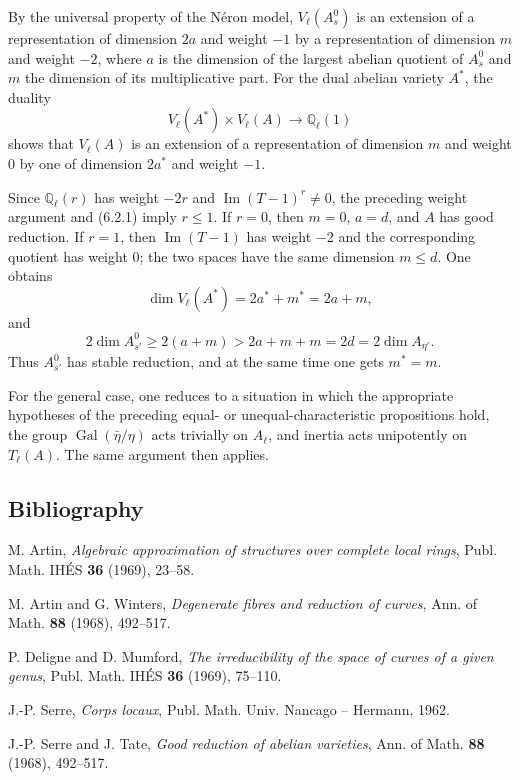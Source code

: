 \documentclass[11pt]{article}
\theoremstyle{plain}
\theoremstyle{definition}
\theoremstyle{remark}
\newcommand{\QQ}{\mathbb Q}
\DeclareMathOperator{\Gal}{Gal}
\begin{document}
By the universal property of the Néron model, $V_\ell(A_s^0)$ is an extension of a representation of dimension $2a$ and weight $-1$ by a representation of dimension $m$ and weight $-2$, where $a$ is the dimension of the largest abelian quotient of $A_s^0$ and $m$ the dimension of its multiplicative part. For the dual abelian variety $A^*$, the duality
\[
V_\ell(A^*)\times V_\ell(A)\to \QQ_\ell(1)
\]
shows that $V_\ell(A)$ is an extension of a representation of dimension $m$ and weight $0$ by one of dimension $2a^*$ and weight $-1$.

Since $\QQ_\ell(r)$ has weight $-2r$ and $\operatorname{Im}(T-1)^r\neq0$, the preceding weight argument and (6.2.1) imply $r\leq1$. If $r=0$, then $m=0$, $a=d$, and $A$ has good reduction. If $r=1$, then $\operatorname{Im}(T-1)$ has weight $-2$ and the corresponding quotient has weight $0$; the two spaces have the same dimension $m\leq d$. One obtains
\[
\dim V_\ell(A^*)=2a^*+m^*=2a+m,
\]
and
\[
2\dim A^0_{s'}\geq 2(a+m)>2a+m+m=2d=2\dim A_{\eta'}.
\]
Thus $A^0_{s'}$ has stable reduction, and at the same time one gets $m^*=m$.

For the general case, one reduces to a situation in which the appropriate hypotheses of the preceding equal- or unequal-characteristic propositions hold, the group $\Gal(\bar\eta/\eta)$ acts trivially on $A_\ell$, and inertia acts unipotently on $T_\ell(A)$. The same argument then applies.

\subsection*{Bibliography}
\begin{enumerate}[label={[\arabic*]}]
\item M. Artin, \emph{Algebraic approximation of structures over complete local rings}, Publ. Math. IHÉS \textbf{36} (1969), 23--58.
\item M. Artin and G. Winters, \emph{Degenerate fibres and reduction of curves}, Ann. of Math. \textbf{88} (1968), 492--517.
\item P. Deligne and D. Mumford, \emph{The irreducibility of the space of curves of a given genus}, Publ. Math. IHÉS \textbf{36} (1969), 75--110.
\item J.-P. Serre, \emph{Corps locaux}, Publ. Math. Univ. Nancago -- Hermann, 1962.
\item J.-P. Serre and J. Tate, \emph{Good reduction of abelian varieties}, Ann. of Math. \textbf{88} (1968), 492--517.
\end{enumerate}
\end{document}
